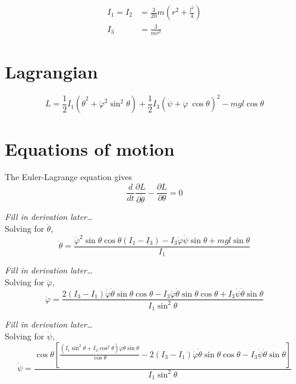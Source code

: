 \documentclass{report}
\begin{document}
\begin{align}
  I_1 = I_2 &= \frac{3}{20} m \left( r^2 + \frac{l^2}{4} \right) \\
  I_3 &= \frac{3}{m r^2}
\end{align}

\section{Lagrangian}

\begin{equation}
  L = \frac{1}{2} I_1 \left( \dot{\theta}^2 + \dot{\varphi}^2 \sin^2\theta \right) + \frac{1}{2} I_3 \left( \dot{\psi} + \dot{\varphi}\ \cos\theta \right)^2 - mgl \cos\theta
\end{equation}

\section{Equations of motion}

The Euler-Lagrange equation gives
\begin{equation}
  \frac{d}{dt} \frac{\partial L}{\partial \dot{\theta}} - \frac{\partial L}{\partial \theta} = 0
\end{equation}

\textit{Fill in derivation later\dots} \\

Solving for $\ddot{\theta}$,
\begin{equation}
  \ddot{\theta} = \frac{\dot{\varphi}^2 \sin\theta \cos\theta(I_1 - I_3) - I_3 \dot{\varphi} \dot{\psi} \sin\theta + mgl \sin\theta}{I_1}
\end{equation}

\textit{Fill in derivation later\dots} \\

Solving for $\ddot{\varphi}$,
\begin{equation}
  \ddot{\varphi} = \frac{2(I_3 - I_1) \dot{\varphi} \dot\theta \sin\theta \cos\theta - I_3 \dot{\varphi} \dot{\theta} \sin\theta \cos\theta + I_3 \dot{\psi} \dot\theta \sin\theta}{I_1 \sin^2\theta}
\end{equation}

\textit{Fill in derivation later\dots} \\

Solving for $\ddot{\psi}$,
\begin{equation}
  \ddot{\psi} = \frac{\cos\theta \left[ \frac{(I_1 \sin^2\theta + I_3 \cos^2\theta) \dot{\varphi} \dot{\theta} \sin\theta}{\cos\theta} - 2(I_3 - I_1) \dot{\varphi} \dot{\theta} \sin\theta \cos\theta - I_3 \dot{\psi} \dot{\theta} \sin\theta \right]}{I_1 \sin^2\theta}
\end{equation}
\end{document}

